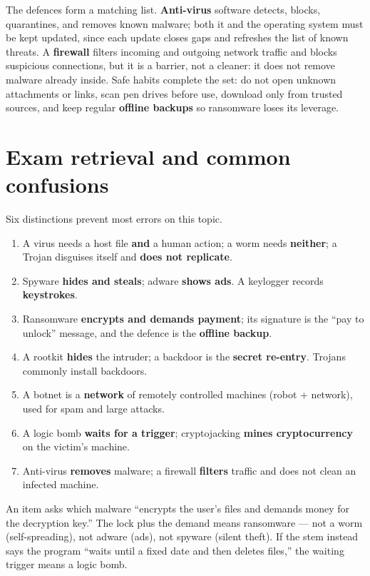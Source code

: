 The defences form a matching list. \textbf{Anti-virus} software detects,
blocks, quarantines, and removes known malware; both it and the operating
system must be kept updated, since each update closes gaps and refreshes the
list of known threats. A \textbf{firewall} filters incoming and outgoing
network traffic and blocks suspicious connections, but it is a barrier, not
a cleaner: it does not remove malware already inside. Safe habits complete
the set: do not open unknown attachments or links, scan pen drives before
use, download only from trusted sources, and keep regular \textbf{offline
backups} so ransomware loses its leverage.

\section{Exam retrieval and common confusions}
Six distinctions prevent most errors on this topic.
\begin{enumerate}
  \item A virus needs a host file \textbf{and} a human action; a worm needs
    \textbf{neither}; a Trojan disguises itself and \textbf{does not
    replicate}.
  \item Spyware \textbf{hides and steals}; adware \textbf{shows ads}. A
    keylogger records \textbf{keystrokes}.
  \item Ransomware \textbf{encrypts and demands payment}; its signature is
    the ``pay to unlock'' message, and the defence is the \textbf{offline
    backup}.
  \item A rootkit \textbf{hides} the intruder; a backdoor is the
    \textbf{secret re-entry}. Trojans commonly install backdoors.
  \item A botnet is a \textbf{network} of remotely controlled machines
    (robot + network), used for spam and large attacks.
  \item A logic bomb \textbf{waits for a trigger}; cryptojacking
    \textbf{mines cryptocurrency} on the victim's machine.
  \item Anti-virus \textbf{removes} malware; a firewall \textbf{filters}
    traffic and does not clean an infected machine.
\end{enumerate}

\begin{example}
An item asks which malware ``encrypts the user's files and demands money
for the decryption key.'' The lock plus the demand means ransomware ---
not a worm (self-spreading), not adware (ads), not spyware (silent theft).
If the stem instead says the program ``waits until a fixed date and then
deletes files,'' the waiting trigger means a logic bomb.
\end{example}

